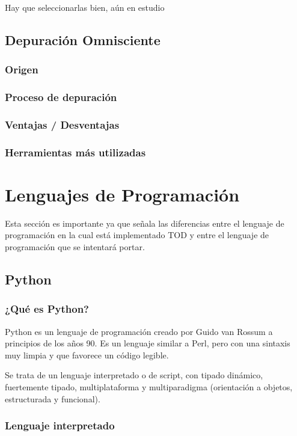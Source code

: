 \documentclass[12pt,a4paper]{report}
\begin{document}
Hay que seleccionarlas bien, aún en estudio

		\subsection{Depuración Omnisciente}
			\subsubsection{Origen}
			\subsubsection{Proceso de depuración}
			\subsubsection{Ventajas / Desventajas}
			\subsubsection{Herramientas más utilizadas}

	\section{Lenguajes de Programación}

Esta sección es importante ya que señala las diferencias entre el lenguaje de programación en la cual está implementado TOD y entre el lenguaje de programación que se intentará portar.

		\subsection{Python}

			\subsubsection{¿Qué es Python?}

Python es un lenguaje de programación creado por Guido van Rossum a principios de los años 90.  Es un lenguaje similar a Perl, pero con una sintaxis muy limpia y que favorece un código legible.

Se trata de un lenguaje interpretado o de script, con tipado dinámico, fuertemente tipado, multiplataforma y multiparadigma (orientación a objetos, estructurada y funcional).

			\subsubsection{Lenguaje interpretado}
\end{document}
